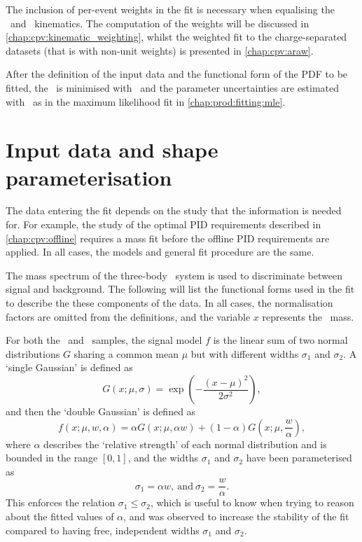 The inclusion of per-event weights in the fit is necessary when equalising the 
\pKK\ and \ppipi\ kinematics.
The computation of the weights will be discussed in 
\cref{chap:cpv:kinematic_weighting}, whilst the weighted fit to the 
charge-separated datasets (that is with non-unit weights) is presented in 
\cref{chap:cpv:araw}.

After the definition of the input data and the functional form of the \ac{PDF} 
to be fitted, the \chisq\ is minimised with \minuit\ and the parameter 
uncertainties are estimated with \hesse\ as in the maximum likelihood fit in 
\cref{chap:prod:fitting:mle}.

\section{Input data and shape parameterisation}
\label{chap:cpv:prelim_fits:data_pdfs}

The data entering the fit depends on the study that the information is needed 
for.
For example, the study of the optimal \ac{PID} requirements described in 
\cref{chap:cpv:offline} requires a mass fit before the offline \ac{PID} 
requirements are applied.
In all cases, the models and general fit procedure are the same.

The mass spectrum of the three-body \phh\ system is used to discriminate 
between signal and background.
The following will list the functional forms used in the fit to describe the 
these components of the data.
In all cases, the normalisation factors are omitted from the definitions, and 
the variable $x$ represents the \PLambdac\ mass.

For both the \pKK\ and \ppipi\ samples, the signal model $f$ is the linear sum 
of two normal distributions $G$ sharing a common mean $\mu$ but with different 
widths $\sigma_{1}$ and $\sigma_{2}$.
A `single Gaussian' is defined as
\begin{equation}
  G(x; \mu, \sigma) = \exp\left(-\frac{{(x - \mu)}^{2}}{2\sigma^{2}}\right),
\end{equation}
and then the `double Gaussian' is defined as
\begin{equation}
  f(x; \mu, w, \alpha) = \alpha{}G(x; \mu, \alpha{w}) +
    (1 - \alpha)G(x; \mu, \frac{w}{\alpha}),
  \label{eqn:cpv:prelim_fits:sig_model}
\end{equation}
where $\alpha$ describes the `relative strength' of each normal distribution 
and is bounded in the range $[0, 1]$, and the widths $\sigma_{1}$ and 
$\sigma_{2}$ have been parameterised as
\begin{equation}
  \sigma_{1} = \alpha{w},\ \text{and}\ \sigma_{2} = \frac{w}{\alpha}.
  \label{eqn:cpv:prelim_fits:sigma_def}
\end{equation}
This enforces the relation $\sigma_{1} \leq \sigma_{2}$, which is useful to 
know when trying to reason about the fitted values of $\alpha$, and was 
observed to increase the stability of the fit compared to having free, 
independent widths $\sigma_{1}$ and $\sigma_{2}$.

